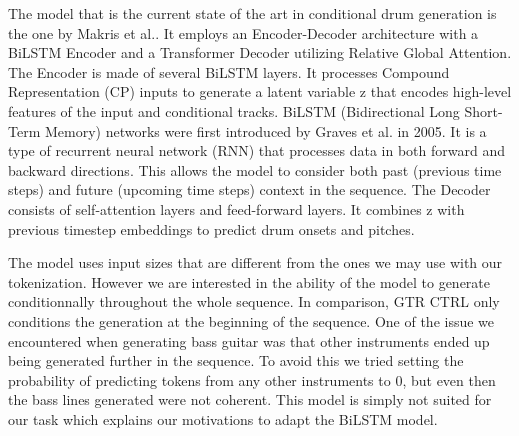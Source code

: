 The model that is the current state of the art in conditional drum generation is the one by Makris et al.\cite{makris_conditional_2022}.
It employs an Encoder-Decoder architecture with a BiLSTM Encoder and a Transformer Decoder utilizing Relative Global Attention.
The Encoder is made of several BiLSTM layers.
It processes Compound Representation (CP) inputs to generate a latent variable z that encodes high-level features of the input and conditional tracks.
BiLSTM (Bidirectional Long Short-Term Memory) networks were first introduced by Graves et al. in 2005\cite{graves_framewise_2005}.
It is a type of recurrent neural network (RNN) that processes data in both forward and backward directions.
This allows the model to consider both past (previous time steps) and future (upcoming time steps) context in the sequence.
The Decoder consists of self-attention layers and feed-forward layers. 
It combines z with previous timestep embeddings to predict drum onsets and pitches.


The model uses input sizes that are different from the ones we may use with our tokenization.
However we are interested in the ability of the model to generate conditionnally throughout the whole sequence.
In comparison, GTR CTRL only conditions the generation at the beginning of the sequence.
One of the issue we encountered when generating bass guitar was that other instruments ended up being generated further in the sequence.
To avoid this we tried setting the probability of predicting tokens from any other instruments to 0, but even then the bass lines generated were not coherent.
This model is simply not suited for our task which explains our motivations to adapt the BiLSTM model.
